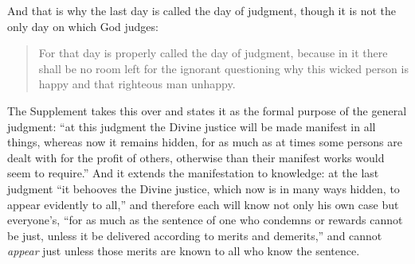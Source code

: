 And that is why the last day is called the day of judgment, though it is not the only day on which God judges:

\begin{quote}
For that day is properly called the day of judgment, because in it there shall be no room left for the ignorant questioning why this wicked person is happy and that righteous man unhappy.
\end{quote}

The Supplement takes this over and states it as the formal purpose of the general judgment: ``at this judgment the Divine justice will be made manifest in all things, whereas now it remains hidden, for as much as at times some persons are dealt with for the profit of others, otherwise than their manifest works would seem to require.'' And it extends the manifestation to knowledge: at the last judgment ``it behooves the Divine justice, which now is in many ways hidden, to appear evidently to all,'' and therefore each will know not only his own case but everyone's, ``for as much as the sentence of one who condemns or rewards cannot be just, unless it be delivered according to merits and demerits,'' and cannot \emph{appear} just unless those merits are known to all who know the sentence.

